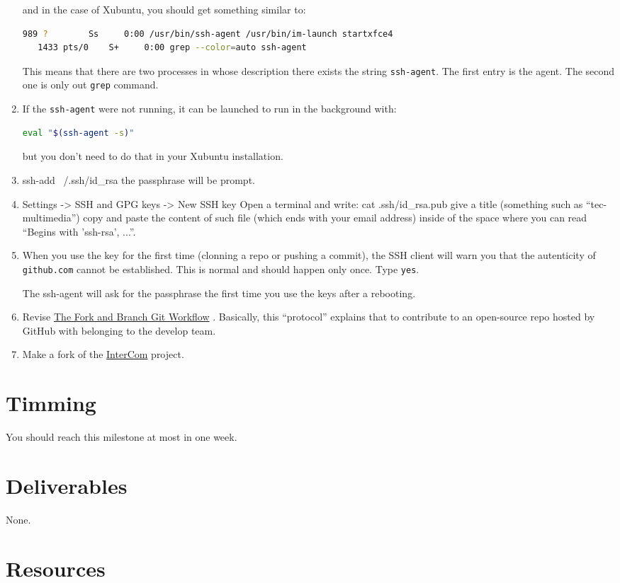 \begin{enumerate}
  and in the case of Xubuntu, you should get something similar to:

  \begin{lstlisting}[language=bash]
    989 ?        Ss     0:00 /usr/bin/ssh-agent /usr/bin/im-launch startxfce4
   1433 pts/0    S+     0:00 grep --color=auto ssh-agent
  \end{lstlisting}

  This means that there are two processes in whose description there
  exists the string \texttt{ssh-agent}. The first entry is the
  agent. The second one is only out \texttt{grep} command.

\item If the \texttt{ssh-agent} were not running, it can be launched to
  run in the background with:

  \begin{lstlisting}[language=bash]
    eval "$(ssh-agent -s)"
  \end{lstlisting}

  but you don't need to do that in your Xubuntu installation.

\item ssh-add ~/.ssh/id_rsa the passphrase will be prompt.
  
\item Settings -> SSH and GPG keys -> New SSH key
  Open a terminal and write:
  cat .ssh/id_rsa.pub
  give a title (something such as ``tec-multimedia'')
  copy and paste the content of such file (which ends with your email address) inside of the space where you can read ``Begins with 'ssh-rsa', ...''.

  \item When you use the key for the first time (clonning a repo or
    pushing a commit), the SSH client will warn you that the
    autenticity of \texttt{github.com} cannot be established. This is
    normal and should happen only once. Type \texttt{yes}.

The ssh-agent will ask for the passphrase the first time you use the keys after a rebooting.
  
\item Revise
  \href{https://github.com/vicente-gonzalez-ruiz/fork_and_branch_git_workflow}{The
    Fork and Branch Git Workflow} \cite{Git-workflow}. Basically, this
  ``protocol'' explains that to contribute to an open-source repo
  hosted by GitHub with belonging to the develop team.

\item Make a fork of the
  \href{https://github.com/Tecnologias-multimedia/intercom}{InterCom}
  project.
  
  
\end{enumerate}

\section{Timming}

You should reach this milestone at most in one week.

\section{Deliverables}

None.

\section{Resources}


